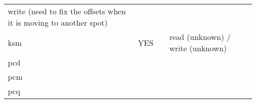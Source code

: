 \begin{longtable}[]{@{}llll@{}}
\begin{minipage}[t]{0.22\columnwidth}
write (need to fix the offsets when it is moving to another spot)\strut
\end{minipage}\tabularnewline
\begin{minipage}[t]{0.19\columnwidth}\raggedright
ksm\strut
\end{minipage} & \begin{minipage}[t]{0.22\columnwidth}\raggedright
YES\strut
\end{minipage} & \begin{minipage}[t]{0.25\columnwidth}\raggedright
\strut
\end{minipage} & \begin{minipage}[t]{0.22\columnwidth}\raggedright
read (unknown) / write (unknown)\strut
\end{minipage}\tabularnewline
\begin{minipage}[t]{0.19\columnwidth}\raggedright
pcd\strut
\end{minipage} & \begin{minipage}[t]{0.22\columnwidth}\raggedright
\strut
\end{minipage} & \begin{minipage}[t]{0.25\columnwidth}\raggedright
\strut
\end{minipage} & \begin{minipage}[t]{0.22\columnwidth}\raggedright
\strut
\end{minipage}\tabularnewline
\begin{minipage}[t]{0.19\columnwidth}\raggedright
pcm\strut
\end{minipage} & \begin{minipage}[t]{0.22\columnwidth}\raggedright
\strut
\end{minipage} & \begin{minipage}[t]{0.25\columnwidth}\raggedright
\strut
\end{minipage} & \begin{minipage}[t]{0.22\columnwidth}\raggedright
\strut
\end{minipage}\tabularnewline
\begin{minipage}[t]{0.19\columnwidth}\raggedright
pcq\strut
\end{minipage} & \begin{minipage}[t]{0.22\columnwidth}\raggedright
\strut
\end{minipage} & \begin{minipage}[t]{0.25\columnwidth}\raggedright
\strut
\end{minipage} & \begin{minipage}[t]{0.22\columnwidth}\raggedright

\end{minipage}
\end{longtable}
